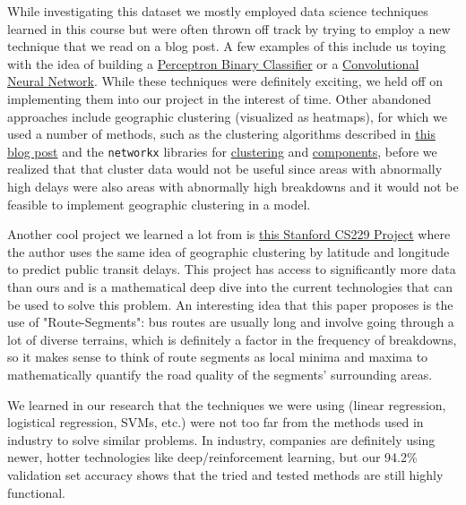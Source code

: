 \documentclass[11pt]{article}
\begin{document}
While investigating this dataset we mostly employed data science techniques learned in this course but were often thrown off track by trying to employ a new technique that we read on a blog post. A few examples of this include us toying with the idea of building a \href{https://machinelearningmastery.com/implement-perceptron-algorithm-scratch-python/}{\color{blue}Perceptron Binary Classifier} or a \href{https://arxiv.org/pdf/1509.03891v1.pdf}{\color{blue}Convolutional Neural Network}. While these techniques were definitely exciting, we held off on implementing them into our project in the interest of time. Other abandoned approaches include geographic clustering (visualized as heatmaps), for which we used a number of methods, such as the clustering algorithms described in \href{https://towardsdatascience.com/the-5-clustering-algorithms-data-scientists-need-to-know-a36d136ef68}{\color{blue}this blog post} and the \texttt{networkx} libraries for \href{https://networkx.github.io/documentation/stable/reference/algorithms/clustering.html}{\color{blue}clustering} and \href{https://networkx.github.io/documentation/networkx-1.10/reference/algorithms.component.html}{\color{blue}components}, before we realized that that cluster data would not be useful since areas with abnormally high delays were also areas with abnormally high breakdowns and it would not be feasible to implement geographic clustering in a model.

Another cool project we learned a lot from is \href{http://cs229.stanford.edu/proj2016/report/Nissimoff-RealTimeLearningAndPredictionOfPublicTransitBusArrivalTimes-report.pdf}{\color{blue}this Stanford CS229 Project} where the author uses the same idea of geographic clustering by latitude and longitude to predict public transit delays. This project has access to significantly more data than ours and is a mathematical deep dive into the current technologies that can be used to solve this problem. An interesting idea that this paper proposes is the use of "Route-Segments": bus routes are usually long and involve going through a lot of diverse terrains, which is definitely a factor in the frequency of breakdowns, so it makes sense to think of route segments as local minima and maxima to mathematically quantify the road quality of the segments' surrounding areas.

We learned in our research that the techniques we were using (linear regression, logistical regression, SVMs, etc.) were not too far from the methods used in industry to solve similar problems. In industry, companies are definitely using newer, hotter technologies like deep/reinforcement learning, but our 94.2\% validation set accuracy shows that the tried and tested methods are still highly functional.
\end{document}

